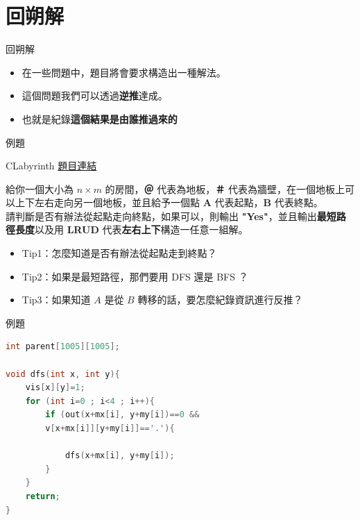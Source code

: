 \documentclass[mathserif]{beamer}
\begin{document}
\section{回朔解}

\begin{frame}{回朔解}
    \begin{itemize}
        \item 在一些問題中，題目將會要求構造出一種解法。
        \item 這個問題我們可以透過\textbf{逆推}達成。
        \item 也就是紀錄\textbf{這個結果是由誰推過來的}
    \end{itemize}
\end{frame}

\begin{frame}{例題}
    \begin{block}{CLabyrinth}
        \href{https://cses.fi/problemset/task/1193}{題目連結}

        給你一個大小為 $n \times m$ 的房間，\textbf{＠} 代表為地板，\textbf{＃} 代表為牆壁，在一個地板上可以上下左右走向另一個地板，並且給予一個點 \textbf{A} 代表起點，\textbf{B} 代表終點。\\
        \vspace{1em}
        請判斷是否有辦法從起點走向終點，如果可以，則輸出 \textbf{"Yes"}，並且輸出\textbf{最短路徑長度}以及用 \textbf{LRUD} 代表\textbf{左右上下}構造一任意一組解。
    \end{block}
    \begin{itemize}
        \item<2-> Tip1：怎麼知道是否有辦法從起點走到終點？
        \item<3-> Tip2：如果是最短路徑，那們要用 DFS 還是 BFS ？
        \item<4-> Tip3：如果知道 $A$ 是從 $B$ 轉移的話，要怎麼紀錄資訊進行反推？
    \end{itemize}
\end{frame}

\begin{frame}[fragile]{例題}
\begin{lstlisting}[language=C++, caption={}]
int parent[1005][1005];

void dfs(int x, int y){
    vis[x][y]=1;
    for (int i=0 ; i<4 ; i++){
        if (out(x+mx[i], y+my[i])==0 &&
        v[x+mx[i]][y+my[i]]=='.'){
            
            dfs(x+mx[i], y+my[i]);
        }
    }
    return;
}
\end{lstlisting}
\end{frame}
\end{document}

